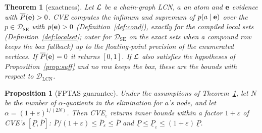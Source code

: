 \documentclass{article} %
\newtheorem{theorem}{Theorem}
\newtheorem{proposition}{Proposition}
\newcommand{\DSE}{\mathcal{D}_{\mathrm{SE}}}
\newcommand{\DLCN}{\mathcal{D}_{\mathrm{LCN}}}
\begin{document}
\begin{theorem}[exactness]\label{thm:cve}
Let $\mathcal{L}$ be a chain-graph LCN, $a$ an atom and $\mathbf{e}$ evidence with $\overline{P}(\mathbf{e})>0$. CVE computes the infimum and supremum of $p(a\mid\mathbf{e})$ over the $p\in\DSE$ with $p(\mathbf{e})>0$ (Definition~\ref{def:cond}), exactly for the compiled local sets (Definition~\ref{def:localset}; outer for $\DSE$ on the exact sets when a compound row keeps the box fallback) up to the floating-point precision of the enumerated vertices. If $\overline{P}(\mathbf{e})=0$ it returns $[0,1]$. If $\mathcal{L}$ also satisfies the hypotheses of Proposition~\ref{prop:suff} and no row keeps the box, these are the bounds with respect to $\DLCN$.
\end{theorem}

\begin{proposition}[FPTAS guarantee]\label{prop:cve-fptas}
Under the assumptions of Theorem~\ref{thm:cve}, let $N$ be the number of $\alpha$-quotients in the elimination for $a$'s node, and let $\alpha = (1+\varepsilon)^{1/(2N)}$. Then CVE$_\varepsilon$ returns \emph{inner} bounds within a factor $1+\varepsilon$ of CVE's $[\underline{P},\overline{P}]$:
$\overline{P}/(1+\varepsilon) \le \overline{P}_\varepsilon \le \overline{P}$ and $\underline{P} \le \underline{P}_\varepsilon \le (1+\varepsilon)\,\underline{P}$.
\end{proposition}
\end{document}
